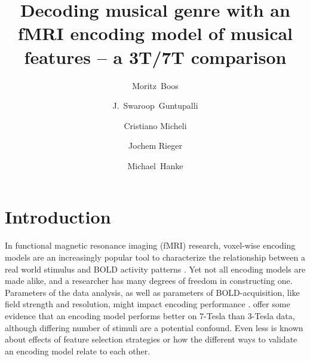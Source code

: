 



\title{Decoding musical genre with an fMRI encoding model of musical
features -- a 3T/7T comparison}


\author[1]{Moritz~Boos}
\author[2]{J.~Swaroop~Guntupalli}
\author[1]{Cristiano Micheli}
\author[1]{Jochem Rieger}
\author[3,4]{Michael~Hanke}

\maketitle
\thispagestyle{fancy}

\listoftodos

\begin{abstract}

\end{abstract}

\clearpage


\section*{Introduction}

In functional magnetic resonance imaging (f{MRI}) research, voxel-wise encoding
models are an increasingly popular tool to characterize the
relationship between a real world stimulus and BOLD activity patterns
\citep{NG11,TD+06,KG+08,SZ09}.
Yet not all encoding models are made alike, and a researcher has many degrees
of freedom in constructing one.
Parameters of the data analysis, as well as parameters of BOLD-acquisition, like field strength and resolution,
might impact encoding performance \citep{KB07,FK12}. \citet{SF14} offer some evidence that an
encoding model performs better on 7-Tesla than 3-Tesla data, although differing
number of stimuli are a potential confound.
Even less is known about effects of feature selection strategies or how
the different ways to validate an encoding model relate to each other.

